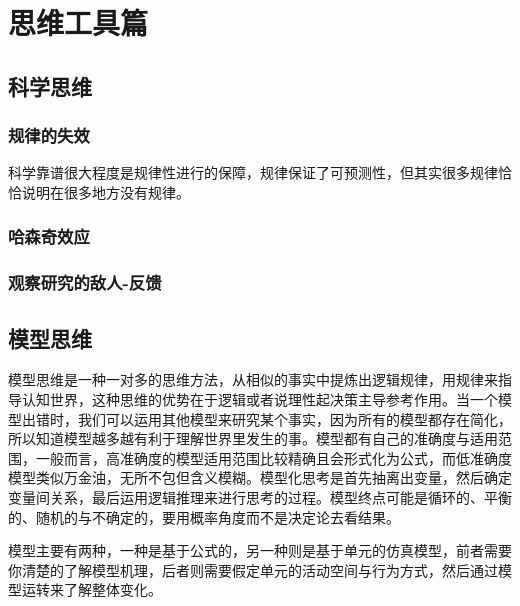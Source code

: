 \documentclass[]{tufte-book}
\begin{document}
\hypertarget{thought}{%
\chapter{思维工具篇}\label{thought}}

\hypertarget{ux79d1ux5b66ux601dux7ef4}{%
\section{科学思维}\label{ux79d1ux5b66ux601dux7ef4}}

\hypertarget{ux89c4ux5f8bux7684ux5931ux6548}{%
\subsection{规律的失效}\label{ux89c4ux5f8bux7684ux5931ux6548}}

科学靠谱很大程度是规律性进行的保障，规律保证了可预测性，但其实很多规律恰恰说明在很多地方没有规律。

\hypertarget{ux54c8ux68eeux5947ux6548ux5e94}{%
\subsection{哈森奇效应}\label{ux54c8ux68eeux5947ux6548ux5e94}}

\hypertarget{ux89c2ux5bdfux7814ux7a76ux7684ux654cux4eba-ux53cdux9988}{%
\subsection{观察研究的敌人-反馈}\label{ux89c2ux5bdfux7814ux7a76ux7684ux654cux4eba-ux53cdux9988}}

\hypertarget{ux6a21ux578bux601dux7ef4}{%
\section{模型思维}\label{ux6a21ux578bux601dux7ef4}}

模型思维是一种一对多的思维方法，从相似的事实中提炼出逻辑规律，用规律来指导认知世界，这种思维的优势在于逻辑或者说理性起决策主导参考作用。当一个模型出错时，我们可以运用其他模型来研究某个事实，因为所有的模型都存在简化，所以知道模型越多越有利于理解世界里发生的事。模型都有自己的准确度与适用范围，一般而言，高准确度的模型适用范围比较精确且会形式化为公式，而低准确度模型类似万金油，无所不包但含义模糊。模型化思考是首先抽离出变量，然后确定变量间关系，最后运用逻辑推理来进行思考的过程。模型终点可能是循环的、平衡的、随机的与不确定的，要用概率角度而不是决定论去看结果。

模型主要有两种，一种是基于公式的，另一种则是基于单元的仿真模型，前者需要你清楚的了解模型机理，后者则需要假定单元的活动空间与行为方式，然后通过模型运转来了解整体变化。
\end{document}
